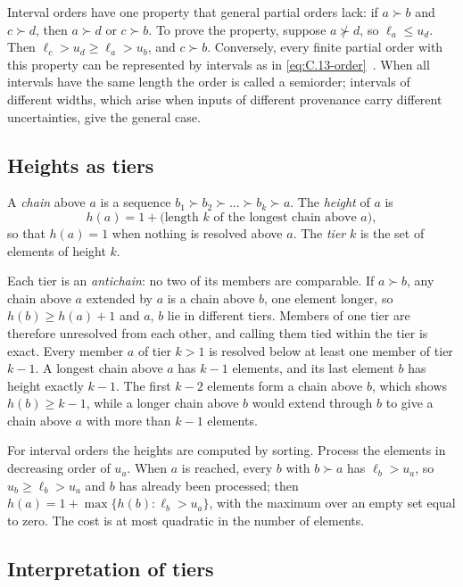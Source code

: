 Interval orders have one property that general partial orders lack: if $a \succ b$ and $c \succ d$, then $a \succ d$ or $c \succ b$. To prove the property, suppose $a \not\succ d$, so $\ell_a \le u_d$. Then $\ell_c > u_d \ge \ell_a > u_b$, and $c \succ b$. Conversely, every finite partial order with this property can be represented by intervals as in \cref{eq:C.13-order}~\cite{fishburn1970intransitive}. When all intervals have the same length the order is called a semiorder; intervals of different widths, which arise when inputs of different provenance carry different uncertainties, give the general case.

\subsection{Heights as tiers}

A \emph{chain} above $a$ is a sequence $b_1 \succ b_2 \succ \dots \succ b_k \succ a$. The \emph{height} of $a$ is
\begin{equation}
  h(a) = 1 + \bigl(\text{length } k \text{ of the longest chain above } a\bigr) ,
  \label{eq:C.13-height}
\end{equation}
so that $h(a) = 1$ when nothing is resolved above $a$. The \emph{tier} $k$ is the set of elements of height $k$.

Each tier is an \emph{antichain}: no two of its members are comparable. If $a \succ b$, any chain above $a$ extended by $a$ is a chain above $b$, one element longer, so $h(b) \ge h(a) + 1$ and $a$, $b$ lie in different tiers. Members of one tier are therefore unresolved from each other, and calling them tied within the tier is exact. Every member $a$ of tier $k > 1$ is resolved below at least one member of tier $k - 1$. A longest chain above $a$ has $k - 1$ elements, and its last element $b$ has height exactly $k - 1$. The first $k - 2$ elements form a chain above $b$, which shows $h(b) \ge k - 1$, while a longer chain above $b$ would extend through $b$ to give a chain above $a$ with more than $k - 1$ elements.

For interval orders the heights are computed by sorting. Process the elements in decreasing order of $u_a$. When $a$ is reached, every $b$ with $b \succ a$ has $\ell_b > u_a$, so $u_b \ge \ell_b > u_a$ and $b$ has already been processed; then $h(a) = 1 + \max\{h(b) : \ell_b > u_a\}$, with the maximum over an empty set equal to zero. The cost is at most quadratic in the number of elements.

\subsection{Interpretation of tiers}

